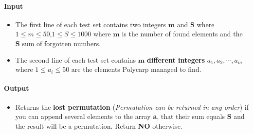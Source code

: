 \documentclass[a4paper]{exam}
\begin{document}
\begin{questions}
\begin{itemize}
    \end{itemize}


    \paragraph{Input}

    \begin{itemize}
        \item The first line of each test set contains two integers $\mathbf{m}$ and $\mathbf{S}$ where $ 1 \leq m \leq 50 $,$1 \leq S \leq 1000 $ where $\mathbf{m}$ is the number of found elements
        and the $\mathbf{S}$ sum of forgotten numbers.
        \item The second line of each test set contains $\mathbf{m}$ \textbf{different integers} $a_1,a_2, \cdots, a_m$ where $1 \leq a_i \leq 50$ are the elements Polycarp managed to find.
    \end{itemize}

    \paragraph{Output}
    \begin{itemize}
        \item Returns the \textbf{lost permutation} (\textit{Permutation can be returned in any order}) if you can append several elements to the array \textbf{a},
        that their sum equals $\mathbf{S}$ and the result will be a permutation. Return \textbf{NO} otherwise.
    \end{itemize}


\end{questions}
\end{document}
